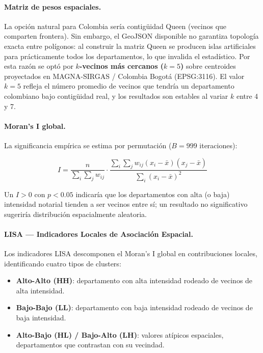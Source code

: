\documentclass{article}
\begin{document}
\paragraph{Matriz de pesos espaciales.}
La opción natural para Colombia sería contigüidad Queen (vecinos que
comparten frontera). Sin embargo, el GeoJSON disponible no garantiza
topología exacta entre polígonos: al construir la matriz Queen se
producen islas artificiales para prácticamente todos los departamentos,
lo que invalida el estadístico. Por esta razón se optó por
\textbf{$k$-vecinos más cercanos ($k=5$)} sobre centroides proyectados
en MAGNA-SIRGAS / Colombia Bogotá (EPSG:3116). El valor $k=5$ refleja
el número promedio de vecinos que tendría un departamento colombiano
bajo contigüidad real, y los resultados son estables al variar $k$
entre 4 y 7.

\paragraph{Moran's I global.}
La significancia empírica se estima por permutación ($B=999$ iteraciones):

\begin{equation}
I = \frac{n}{\sum_{i}\sum_{j} w_{ij}}
    \cdot
    \frac{\sum_{i}\sum_{j} w_{ij}(x_i - \bar{x})(x_j - \bar{x})}
         {\sum_{i}(x_i - \bar{x})^2}
\end{equation}

Un $I > 0$ con $p < 0.05$ indicaría que los departamentos con alta
(o baja) intensidad notarial tienden a ser vecinos entre sí; un resultado
no significativo sugeriría distribución espacialmente aleatoria.

\paragraph{LISA — Indicadores Locales de Asociación Espacial.}
Los indicadores LISA descomponen el Moran's I global en contribuciones
locales, identificando cuatro tipos de clusters:
\begin{itemize}
    \item \textbf{Alto-Alto (HH)}: departamento con alta intensidad
    rodeado de vecinos de alta intensidad.
    \item \textbf{Bajo-Bajo (LL)}: departamento con baja intensidad
    rodeado de vecinos de baja intensidad.
    \item \textbf{Alto-Bajo (HL) / Bajo-Alto (LH)}: valores atípicos
    espaciales, departamentos que contrastan con su vecindad.
\end{itemize}
\end{document}
